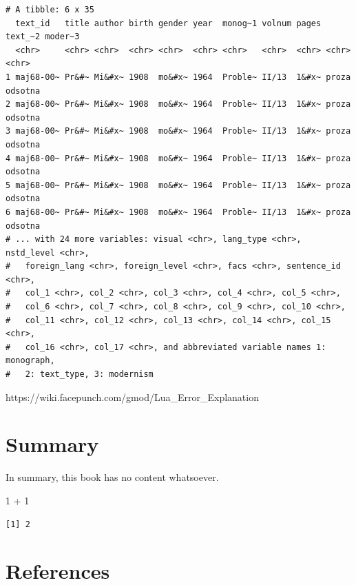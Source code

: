 \documentclass[
  letterpaper,
]{scrbook}
\newenvironment{Shaded}{\begin{snugshade}}{\end{snugshade}}
\newcommand{\DecValTok}[1]{\textcolor[rgb]{0.68,0.00,0.00}{#1}}
\newcommand{\SpecialCharTok}[1]{\textcolor[rgb]{0.37,0.37,0.37}{#1}}
\newlength{\cslhangindent}
\newlength{\cslentryspacingunit} %
\newenvironment{CSLReferences}[2] %
 {%
  \setlength{\parindent}{0pt}
  \ifodd #1
  \let\oldpar\par
  \def\par{\hangindent=\cslhangindent\oldpar}
  \fi
  \setlength{\parskip}{#2\cslentryspacingunit}
 }%
 {}
\begin{document}
\begin{verbatim}
# A tibble: 6 x 35
  text_id   title author birth gender year  monog~1 volnum pages text_~2 moder~3
  <chr>     <chr> <chr>  <chr> <chr>  <chr> <chr>   <chr>  <chr> <chr>   <chr>  
1 maj68-00~ Pr&#~ Mi&#x~ 1908  mo&#x~ 1964  Proble~ II/13  1&#x~ proza   odsotna
2 maj68-00~ Pr&#~ Mi&#x~ 1908  mo&#x~ 1964  Proble~ II/13  1&#x~ proza   odsotna
3 maj68-00~ Pr&#~ Mi&#x~ 1908  mo&#x~ 1964  Proble~ II/13  1&#x~ proza   odsotna
4 maj68-00~ Pr&#~ Mi&#x~ 1908  mo&#x~ 1964  Proble~ II/13  1&#x~ proza   odsotna
5 maj68-00~ Pr&#~ Mi&#x~ 1908  mo&#x~ 1964  Proble~ II/13  1&#x~ proza   odsotna
6 maj68-00~ Pr&#~ Mi&#x~ 1908  mo&#x~ 1964  Proble~ II/13  1&#x~ proza   odsotna
# ... with 24 more variables: visual <chr>, lang_type <chr>, nstd_level <chr>,
#   foreign_lang <chr>, foreign_level <chr>, facs <chr>, sentence_id <chr>,
#   col_1 <chr>, col_2 <chr>, col_3 <chr>, col_4 <chr>, col_5 <chr>,
#   col_6 <chr>, col_7 <chr>, col_8 <chr>, col_9 <chr>, col_10 <chr>,
#   col_11 <chr>, col_12 <chr>, col_13 <chr>, col_14 <chr>, col_15 <chr>,
#   col_16 <chr>, col_17 <chr>, and abbreviated variable names 1: monograph,
#   2: text_type, 3: modernism
\end{verbatim}

https://wiki.facepunch.com/gmod/Lua\_Error\_Explanation


\hypertarget{summary}{%
\chapter{Summary}\label{summary}}

In summary, this book has no content whatsoever.

\begin{Shaded}
\begin{Highlighting}[]
\DecValTok{1} \SpecialCharTok{+} \DecValTok{1}
\end{Highlighting}
\end{Shaded}

\begin{verbatim}
[1] 2
\end{verbatim}


\hypertarget{references}{%
\chapter*{References}\label{references}}


\hypertarget{refs}{}
\begin{CSLReferences}{0}{0}
\end{CSLReferences}


\backmatter

\printindex
\end{document}
